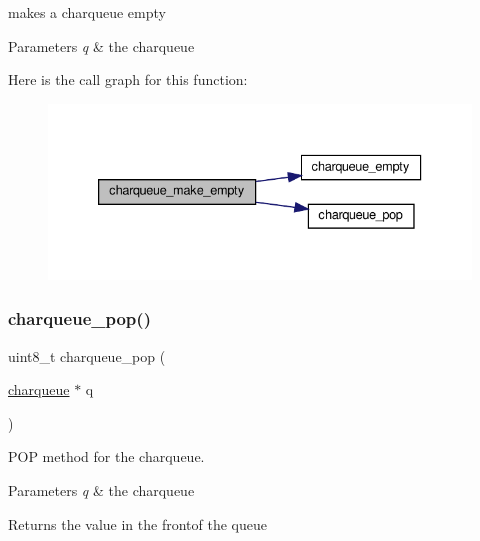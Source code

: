 makes a charqueue empty 


\begin{DoxyParams}{Parameters}
{\em q} & the charqueue \\
\hline
\end{DoxyParams}
Here is the call graph for this function\+:\nopagebreak
\begin{figure}[H]
\begin{center}
\leavevmode
\includegraphics[width=333pt]{group__Queue_ga4c29bcf6ba2eca0528b3ac7889361b3f_cgraph}
\end{center}
\end{figure}
\mbox{\label{group__Queue_gacdaded4e5bcc6ae01a6d789985381553}} 
\subsubsection{\texorpdfstring{charqueue\+\_\+pop()}{charqueue\_pop()}}
{\footnotesize\ttfamily uint8\+\_\+t charqueue\+\_\+pop (\begin{DoxyParamCaption}\item[{\hyperlink{structcharqueue}{charqueue} $\ast$}]{q }\end{DoxyParamCaption})}



P\+OP method for the charqueue. 


\begin{DoxyParams}{Parameters}
{\em q} & the charqueue \\
\hline
\end{DoxyParams}
\begin{DoxyReturn}{Returns}
the value in the frontof the queue 
\end{DoxyReturn}
\mbox{\label{group__Queue_ga0ea8507c596fb50285773fd50f0a818d}} 
